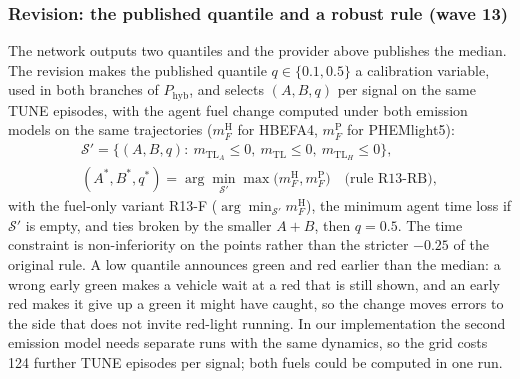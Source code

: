 \subsubsection{Revision: the published quantile and a robust rule (wave 13)}
The network outputs two quantiles and the provider above publishes the median. The revision makes the published quantile
$q\in\{0.1,0.5\}$ a calibration variable, used in both branches of $P_{\mathrm{hyb}}$, and selects $(A,B,q)$ per signal on the same TUNE
episodes, with the agent fuel change computed under both emission models on the same trajectories ($m_F^{\mathrm{H}}$ for HBEFA4,
$m_F^{\mathrm{P}}$ for PHEMlight5):
\begin{gather}
\mathcal S'=\{(A,B,q):\ m_{\mathrm{TL}_A}\le0,\ m_{\mathrm{TL}}\le0,\ m_{\mathrm{TL}_H}\le0\},\\
(A^*,B^*,q^*)=\arg\min_{\mathcal S'}\max\big(m_F^{\mathrm{H}},m_F^{\mathrm{P}}\big)\quad\text{(rule R13-RB)},
\end{gather}
with the fuel-only variant R13-F ($\arg\min_{\mathcal S'} m_F^{\mathrm{H}}$), the minimum agent time loss if $\mathcal S'$ is empty, and ties
broken by the smaller $A+B$, then $q=0.5$. The time constraint is non-inferiority on the points rather than the stricter $-0.25$ of the
original rule. A low quantile announces green and red earlier than the median: a wrong early green makes a vehicle wait at a red that is still
shown, and an early red makes it give up a green it might have caught, so the change moves errors to the side that does not invite red-light
running. In our implementation the second emission model needs separate runs with the same dynamics, so the grid costs 124 further TUNE
episodes per signal; both fuels could be computed in one run.

